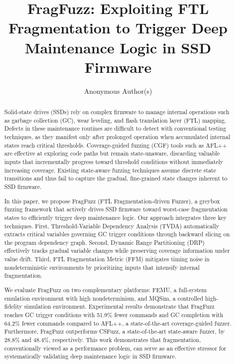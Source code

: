 \documentclass[conference]{IEEEtran}
\begin{document}
\title{FragFuzz: Exploiting FTL Fragmentation to Trigger Deep Maintenance Logic in SSD Firmware}

\author{Anonymous Author(s)}

\maketitle

\begin{abstract}
Solid-state drives (SSDs) rely on complex firmware to manage internal operations such as garbage collection (GC), wear leveling, and flash translation layer (FTL) mapping.
Defects in these maintenance routines are difficult to detect with conventional testing techniques, as they manifest only after prolonged operation when accumulated internal states reach critical thresholds.
Coverage-guided fuzzing (CGF) tools such as AFL++ are effective at exploring code paths but remain state-unaware, discarding valuable inputs that incrementally progress toward threshold conditions without immediately increasing coverage.
Existing state-aware fuzzing techniques assume discrete state transitions and thus fail to capture the gradual, fine-grained state changes inherent to SSD firmware.

In this paper, we propose FragFuzz (FTL Fragmentation-driven Fuzzer), a greybox fuzzing framework that actively drives SSD firmware toward worst-case fragmentation states to efficiently trigger deep maintenance logic.
Our approach integrates three key techniques.
First, Threshold-Variable Dependency Analysis (TVDA) automatically extracts critical variables governing GC trigger conditions through backward slicing on the program dependency graph.
Second, Dynamic Range Partitioning (DRP) effectively tracks gradual variable changes while preserving coverage information under value drift.
Third, FTL Fragmentation Metric (FFM) mitigates timing noise in nondeterministic environments by prioritizing inputs that intensify internal fragmentation.

We evaluate FragFuzz on two complementary platforms: FEMU, a full-system emulation environment with high nondeterminism, and MQSim, a controlled high-fidelity simulation environment.
Experimental results demonstrate that FragFuzz reaches GC trigger conditions with 51.9\% fewer commands and GC completion with 64.2\% fewer commands compared to AFL++, a state-of-the-art coverage-guided fuzzer.
Furthermore, FragFuzz outperforms CSFuzz, a state-of-the-art state-aware fuzzer, by 28.8\% and 48.4\%, respectively.
This work demonstrates that fragmentation, conventionally viewed as a performance problem, can serve as an effective stressor for systematically validating deep maintenance logic in SSD firmware.
\end{abstract}
\end{document}
